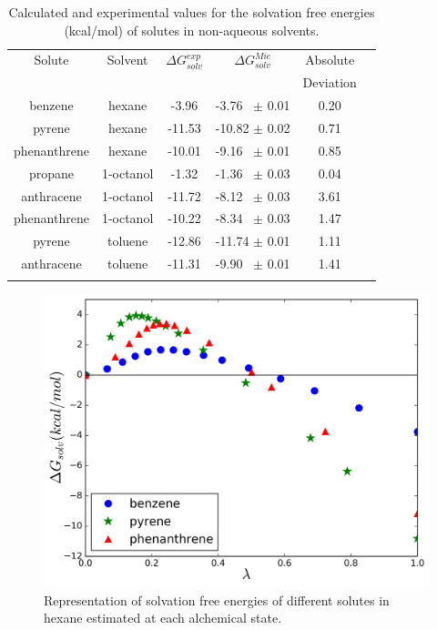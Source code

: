 \documentclass[final,12p,times,twocolumn]{elsarticle}
\begin{document}
	\begin{table}[h]
		\centering
		\caption{Calculated and experimental values for the solvation free energies (kcal/mol) of solutes in non-aqueous solvents.}
		\label{tbl:solv1}
		\begin{tabular}{cccccc}
			\hline\hline
			Solute       & Solvent   & $\Delta G_{solv}^{exp}$ & $\Delta G_{solv}^{Mie}$ & Absolute  &  \\
			&           &                         &                         & Deviation &  \\ \hline
			benzene      & hexane    & -3.96                   & -3.76  $\,$ $\pm$ 0.01       & 0.20      &  \\
			pyrene       & hexane    & -11.53                  & -10.82 $\pm$ 0.02       & 0.71      &  \\
			phenanthrene & hexane    & -10.01                  & -9.16  $\,$ $\pm$ 0.01       & 0.85      &  \\
			propane      & 1-octanol & -1.32                   & -1.36  $\,$ $\pm$ 0.03       & 0.04      &  \\
			anthracene   & 1-octanol & -11.72                  & -8.12   $\,$ $\pm$ 0.03       & 3.61      &  \\
			phenanthrene & 1-octanol & -10.22                  & -8.34  $\,$ $\pm$ 0.03       & 1.47      &  \\
			pyrene       & toluene   & -12.86                  & -11.74 $\pm$ 0.01       & 1.11      &  \\
			anthracene   & toluene   & -11.31                  & -9.90 $\,$ $\pm$ 0.01        & 1.41      &  \\ \hline\hline
			&
		\end{tabular}
	\end{table}
	\begin{figure}[h]
		\centering
		\includegraphics[width=1.0\linewidth]{Figures/hexart}
		\caption{Representation of solvation free energies of different solutes in hexane estimated at each alchemical state.}
		\label{fig:hex}
	\end{figure}
\end{document}

